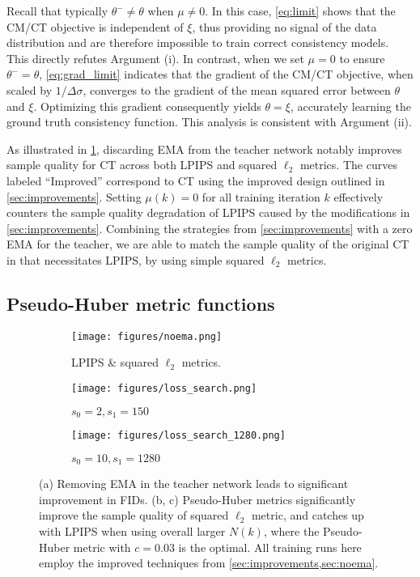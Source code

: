 Recall that typically $\theta^{-} \neq \theta$ when $\mu \neq 0$. In this case, \cref{eq:limit} shows that the CM/CT objective is independent of $\xi$, thus providing no signal of the data distribution and are therefore impossible to train correct consistency models. This directly refutes Argument (i). In contrast, when we set $\mu=0$ to ensure $\theta^{-} = \theta$, \cref{eq:grad_limit} indicates that the gradient of the CM/CT objective, when scaled by $1/\Delta \sigma$, converges to the gradient of the mean squared error between $\theta$ and $\xi$. Optimizing this gradient consequently yields $\theta = \xi$, accurately learning the ground truth consistency function. This analysis is consistent with Argument (ii).



As illustrated in \cref{fig:noema}, discarding EMA from the teacher network notably improves sample quality for CT across both LPIPS and squared $\ell_2$ metrics. The curves labeled ``Improved'' correspond to CT using the improved design outlined in \cref{sec:improvements}. Setting $\mu(k) = 0$ for all training iteration $k$ effectively counters the sample quality degradation of LPIPS caused by the modifications in \cref{sec:improvements}. Combining the strategies from \cref{sec:improvements} with a zero EMA for the teacher, we are able to match the sample quality of the original CT in \citet{song2023consistency} that necessitates LPIPS, by using simple squared $\ell_2$ metrics.



\subsection{Pseudo-Huber metric functions}\label{sec:pseudo_huber}

\begin{figure}
    \centering
    \begin{subfigure}[b]{0.33\textwidth}
        \centering
        \texttt{[image: figures/noema.png]}
        \caption{LPIPS \& squared $\ell_2$ metrics.}\label{fig:noema}
    \end{subfigure}%
    \begin{subfigure}[b]{0.33\textwidth}
        \centering
        \texttt{[image: figures/loss\_search.png]}
        \caption{$s_0 = 2, s_1 = 150$}
    \end{subfigure}%
    \begin{subfigure}[b]{0.33\textwidth}
        \centering
        \texttt{[image: figures/loss\_search\_1280.png]}
        \caption{$s_0 = 10, s_1 = 1280$}\label{fig:loss_search_1280}
    \end{subfigure}
    \caption{(a) Removing EMA in the teacher network leads to significant improvement in FIDs. (b, c) Pseudo-Huber metrics significantly improve the sample quality of squared $\ell_2$ metric, and catches up with LPIPS when using overall larger $N(k)$, where the Pseudo-Huber metric with $c=0.03$ is the optimal. All training runs here employ the improved techniques from \cref{sec:improvements,sec:noema}.}\label{fig:loss_search}
\end{figure}

